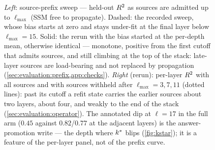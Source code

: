 \begin{figure}[t]
  \centering
  
  \caption{\emph{Left}: source-prefix sweep --- held-out $R^2$ as sources are
  admitted up to $\ell_{\max}$ (SSM free to propagate). Dashed: the recorded
  sweep, whose bias starts at zero and stays under-fit at the final layer
  below $\ell_{\max}{=}15$. Solid: the rerun with the bias started at the
  per-depth mean, otherwise identical --- monotone, positive from the first
  cutoff that admits sources, and still climbing at the top of the stack:
  late-layer sources are load-bearing and not replaced by propagation
  (\cref{sec:evaluation:prefix,app:checks}). \emph{Right} (rerun): per-layer
  $R^2$ with all sources and with sources withheld after
  $\ell_{\max} = 3, 7, 11$ (dotted lines): past its cutoff a refit state
  carries the earlier sources about two layers, about four, and weakly to the
  end of the stack (\cref{sec:evaluation:operator}). The annotated dip at
  $\ell{=}17$ in the full arm ($0.45$ against $0.82$/$0.77$ at the adjacent
  layers) is the answer-promotion write --- the depth where $k^{\ast}$ blips
  (\cref{fig:kstar}); it is a feature of the per-layer panel, not of the
  prefix curve.}
  \label{fig:prefix}
\end{figure}
